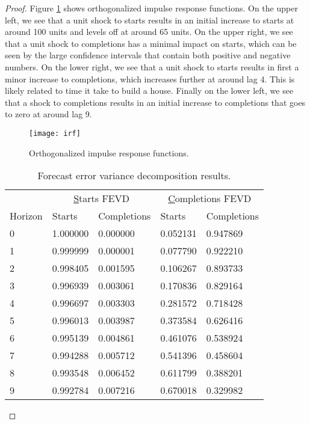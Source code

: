 \documentclass[oneside,reqno]{amsart}
\theoremstyle{definition}
\begin{document}
\begin{proof}
Figure \ref{irf} shows orthogonalized impulse response functions. On the upper left, we see that a unit shock to starts results in an initial increase to starts at around 100 units and levels off at around 65 units. On the upper right, we see that a unit shock to completions has a minimal impact on starts, which can be seen by the large confidence intervals that contain both positive and negative numbers. On the lower right, we see that a unit shock to starts results in first a minor increase to completions, which increases further at around lag 4. This is likely related to time it take to build a house. Finally on the lower left, we see that a shock to completions results in an initial increase to completions that goes to zero at around lag 9. 
\begin{figure}
\texttt{[image: irf]}
\caption{Orthogonalized impulse response functions.}
\label{irf}
\end{figure}
\begin{table}
\caption{Forecast error variance decomposition results.}
\begin{tabular}{lllll}
 & \multicolumn{2}{c}{{\ul Starts FEVD}} & \multicolumn{2}{c}{{\ul Completions FEVD}} \\
Horizon & Starts & Completions & Starts & Completions \\ \hline
0 & 1.000000  & 0.000000  & 0.052131 & 0.947869 \\
1 &  0.999999   &  0.000001 & 0.077790  & 0.922210  \\
2 &  0.998405    & 0.001595   & 0.106267  & 0.893733  \\
3 &  0.996939   &  0.003061  &  0.170836  &   0.829164  \\
4 &  0.996697  &   0.003303  &  0.281572   & 0.718428  \\
5 &  0.996013   &  0.003987  &  0.373584  &   0.626416  \\
6 &  0.995139  &   0.004861  &   0.461076  &   0.538924  \\
7 &  0.994288   &  0.005712  &  0.541396   &  0.458604  \\
8 &  0.993548  &   0.006452  &   0.611799  &   0.388201  \\
9 &  0.992784  &   0.007216  &  0.670018  &   0.329982 \\ \hline
\end{tabular}
\label{fevd}
\end{table}
\end{proof}
\end{document}
